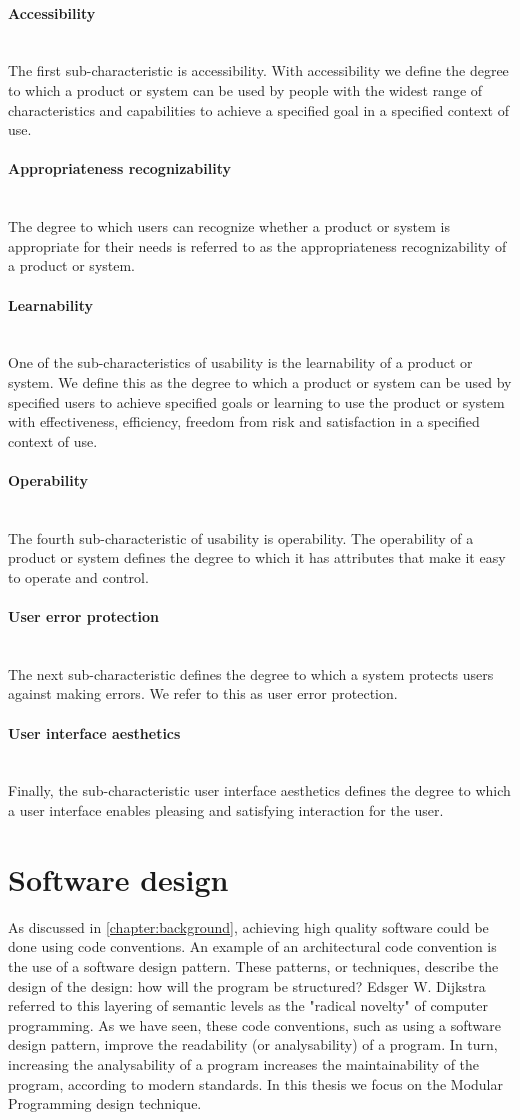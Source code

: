 \documentclass[twoside]{uva-inf-bachelor-thesis}
\newcommand{\myparagraph}[1]{\paragraph{#1}\mbox{}\\}
\begin{document}
\myparagraph{Accessibility}
The first sub-characteristic is accessibility. With accessibility we define the degree to which a product or system can be used by people with the widest range of characteristics and capabilities to achieve a specified goal in a specified context of use.

\myparagraph{Appropriateness recognizability}
The degree to which users can recognize whether a product or system is appropriate for their needs is referred to as the appropriateness recognizability of a product or system.

\myparagraph{Learnability}
One of the sub-characteristics of usability is the learnability of a product or system. We define this as the degree to which a product or system can be used by specified users to achieve specified goals or learning to use the product or system with effectiveness, efficiency, freedom from risk and satisfaction in a specified context of use.

\myparagraph{Operability}
The fourth sub-characteristic of usability is operability. The operability of a product or system defines the degree to which it has attributes that make it easy to operate and control.

\myparagraph{User error protection}
The next sub-characteristic defines the degree to which a system protects users against making errors. We refer to this as user error protection.

\myparagraph{User interface aesthetics}
Finally, the sub-characteristic user interface aesthetics defines the degree to which a user interface enables pleasing and satisfying interaction for the user.

\section{Software design}
As discussed in \autoref{chapter:background}, achieving high quality software could be done using code conventions. An example of an architectural code convention is the use of a software design pattern. These patterns, or techniques, describe the design of the design: how will the program be structured? Edsger W. Dijkstra referred to this layering of semantic levels as the "radical novelty" of computer programming\cite{dijkstra1988}. As we have seen, these code conventions, such as using a software design pattern, improve the readability (or analysability) of a program. In turn, increasing the analysability of a program increases the maintainability of the program, according to modern standards\cite{ISO9126,ISO25010}. In this thesis we focus on the Modular Programming design technique.
\end{document}
